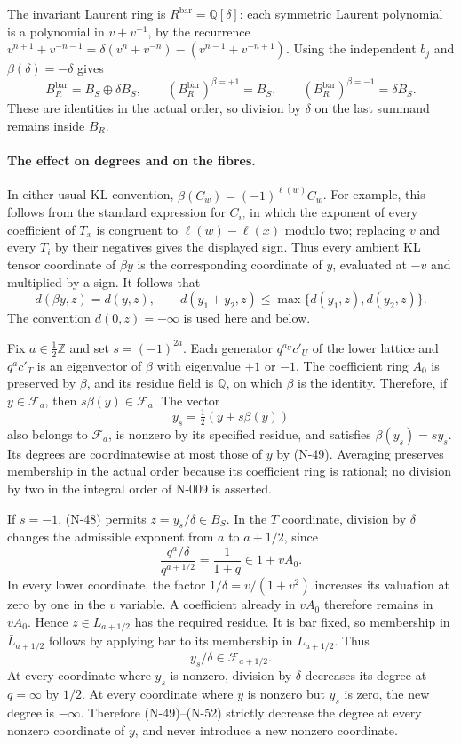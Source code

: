The invariant Laurent ring is $R^{\mathrm{bar}}=\mathbb Q[\delta]$:
each symmetric Laurent polynomial is a polynomial in
$v+v^{-1}$, by the recurrence
$v^{n+1}+v^{-n-1}=\delta(v^n+v^{-n})-(v^{n-1}+v^{-n+1})$.
Using the independent $b_j$ and $\beta(\delta)=-\delta$ gives
\[
 B_R^{\mathrm{bar}}=B_S\oplus\delta B_S,\qquad
 (B_R^{\mathrm{bar}})^{\beta=+1}=B_S,\qquad
 (B_R^{\mathrm{bar}})^{\beta=-1}=\delta B_S.
 \tag{N-48}
\]
These are identities in the actual order, so division by
$\delta$ on the last summand remains inside $B_R$.

\paragraph{The effect on degrees and on the fibres.}
In either usual KL convention,
$\beta(C_w)=(-1)^{\ell(w)}C_w$.  For example, this follows
from the standard expression for $C_w$ in which the exponent
of every coefficient of $T_x$ is congruent to
$\ell(w)-\ell(x)$ modulo two; replacing $v$ and every $T_i$
by their negatives gives the displayed sign.  Thus every
ambient KL tensor coordinate of $\beta y$ is the corresponding
coordinate of $y$, evaluated at $-v$ and multiplied by a sign.
It follows that
\[
 d(\beta y,z)=d(y,z),\qquad
 d(y_1+y_2,z)\le\max\{d(y_1,z),d(y_2,z)\}.
 \tag{N-49}
\]
The convention $d(0,z)=-\infty$ is used here and below.

Fix $a\in\tfrac12\mathbb Z$ and set $s=(-1)^{2a}$.
Each generator $q^{a_U}c'_U$ of the lower lattice and
$q^ac'_T$ is an eigenvector of $\beta$ with eigenvalue $+1$
or $-1$.  The coefficient ring $A_0$ is preserved by $\beta$,
and its residue field is $\mathbb Q$, on which $\beta$ is the
identity.  Therefore, if $y\in\mathcal F_a$, then
$s\beta(y)\in\mathcal F_a$.  The vector
\[
                   y_s=\tfrac12(y+s\beta(y))
 \tag{N-50}
\]
also belongs to $\mathcal F_a$, is nonzero by its specified
residue, and satisfies $\beta(y_s)=s y_s$.
Its degrees are coordinatewise at most those of $y$ by
(N-49).  Averaging preserves membership in the actual order
because its coefficient ring is rational; no division by two
in the integral order of N-009 is asserted.

If $s=-1$, (N-48) permits $z=y_s/\delta\in B_S$.
In the $T$ coordinate, division by $\delta$ changes the
admissible exponent from $a$ to $a+1/2$, since
\[
 \frac{q^a/\delta}{q^{a+1/2}}=\frac1{1+q}\in1+vA_0.
 \tag{N-51}
\]
In every lower coordinate, the factor
$1/\delta=v/(1+v^2)$ increases its valuation at zero by one
in the $v$ variable.  A coefficient already in $vA_0$
therefore remains in $vA_0$.  Hence $z\in L_{a+1/2}$ has the
required residue.  It is bar fixed, so membership in
$\bar L_{a+1/2}$ follows by applying bar to its membership
in $L_{a+1/2}$.  Thus
\[
                 y_s/\delta\in\mathcal F_{a+1/2}.
 \tag{N-52}
\]
At every coordinate where $y_s$ is nonzero, division by
$\delta$ decreases its degree at $q=\infty$ by $1/2$.
At every coordinate where $y$ is nonzero but $y_s$ is zero,
the new degree is $-\infty$.  Therefore (N-49)--(N-52)
strictly decrease the degree at every nonzero coordinate of
$y$, and never introduce a new nonzero coordinate.

